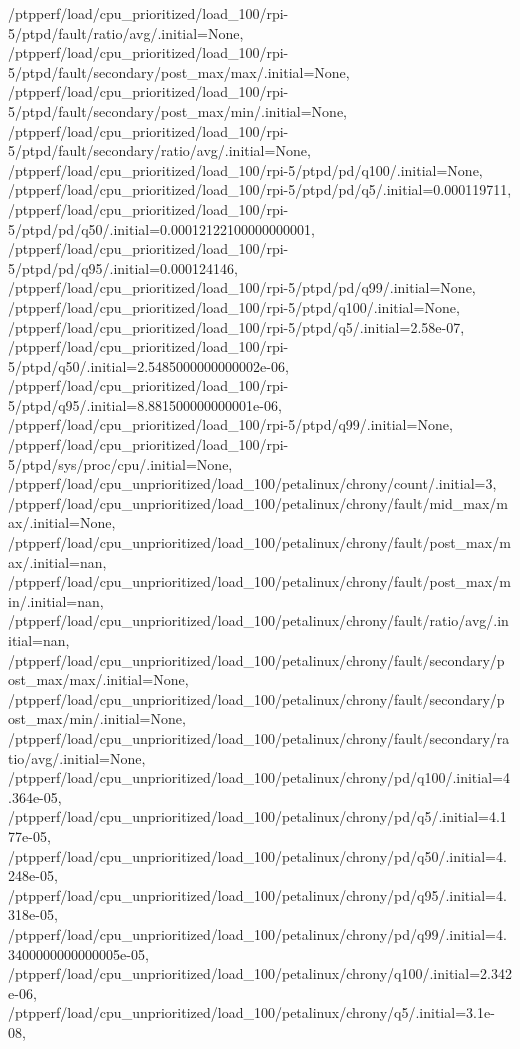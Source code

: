 {    /ptpperf/load/cpu_prioritized/load_100/rpi-5/ptpd/fault/ratio/avg/.initial=None,
    /ptpperf/load/cpu_prioritized/load_100/rpi-5/ptpd/fault/secondary/post_max/max/.initial=None,
    /ptpperf/load/cpu_prioritized/load_100/rpi-5/ptpd/fault/secondary/post_max/min/.initial=None,
    /ptpperf/load/cpu_prioritized/load_100/rpi-5/ptpd/fault/secondary/ratio/avg/.initial=None,
    /ptpperf/load/cpu_prioritized/load_100/rpi-5/ptpd/pd/q100/.initial=None,
    /ptpperf/load/cpu_prioritized/load_100/rpi-5/ptpd/pd/q5/.initial=0.000119711,
    /ptpperf/load/cpu_prioritized/load_100/rpi-5/ptpd/pd/q50/.initial=0.00012122100000000001,
    /ptpperf/load/cpu_prioritized/load_100/rpi-5/ptpd/pd/q95/.initial=0.000124146,
    /ptpperf/load/cpu_prioritized/load_100/rpi-5/ptpd/pd/q99/.initial=None,
    /ptpperf/load/cpu_prioritized/load_100/rpi-5/ptpd/q100/.initial=None,
    /ptpperf/load/cpu_prioritized/load_100/rpi-5/ptpd/q5/.initial=2.58e-07,
    /ptpperf/load/cpu_prioritized/load_100/rpi-5/ptpd/q50/.initial=2.5485000000000002e-06,
    /ptpperf/load/cpu_prioritized/load_100/rpi-5/ptpd/q95/.initial=8.881500000000001e-06,
    /ptpperf/load/cpu_prioritized/load_100/rpi-5/ptpd/q99/.initial=None,
    /ptpperf/load/cpu_prioritized/load_100/rpi-5/ptpd/sys/proc/cpu/.initial=None,
    /ptpperf/load/cpu_unprioritized/load_100/petalinux/chrony/count/.initial=3,
    /ptpperf/load/cpu_unprioritized/load_100/petalinux/chrony/fault/mid_max/max/.initial=None,
    /ptpperf/load/cpu_unprioritized/load_100/petalinux/chrony/fault/post_max/max/.initial=nan,
    /ptpperf/load/cpu_unprioritized/load_100/petalinux/chrony/fault/post_max/min/.initial=nan,
    /ptpperf/load/cpu_unprioritized/load_100/petalinux/chrony/fault/ratio/avg/.initial=nan,
    /ptpperf/load/cpu_unprioritized/load_100/petalinux/chrony/fault/secondary/post_max/max/.initial=None,
    /ptpperf/load/cpu_unprioritized/load_100/petalinux/chrony/fault/secondary/post_max/min/.initial=None,
    /ptpperf/load/cpu_unprioritized/load_100/petalinux/chrony/fault/secondary/ratio/avg/.initial=None,
    /ptpperf/load/cpu_unprioritized/load_100/petalinux/chrony/pd/q100/.initial=4.364e-05,
    /ptpperf/load/cpu_unprioritized/load_100/petalinux/chrony/pd/q5/.initial=4.177e-05,
    /ptpperf/load/cpu_unprioritized/load_100/petalinux/chrony/pd/q50/.initial=4.248e-05,
    /ptpperf/load/cpu_unprioritized/load_100/petalinux/chrony/pd/q95/.initial=4.318e-05,
    /ptpperf/load/cpu_unprioritized/load_100/petalinux/chrony/pd/q99/.initial=4.3400000000000005e-05,
    /ptpperf/load/cpu_unprioritized/load_100/petalinux/chrony/q100/.initial=2.342e-06,
    /ptpperf/load/cpu_unprioritized/load_100/petalinux/chrony/q5/.initial=3.1e-08,
}
